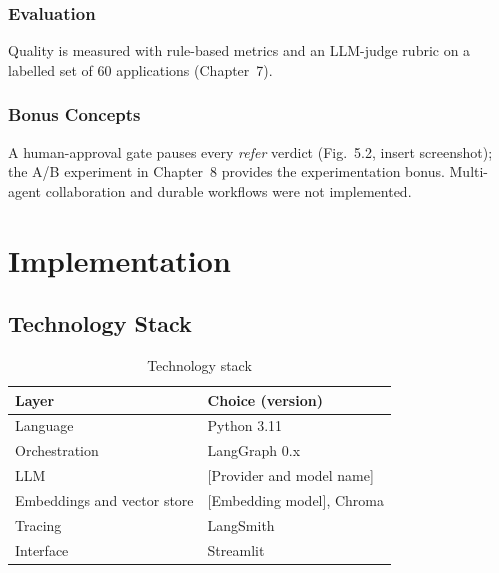 \documentclass[12pt,a4paper,oneside]{report}
\newif\ifguidance
\newcommand{\guide}[1]{%
  \ifguidance
  \begin{tcolorbox}[enhanced,breakable,colback=guidebg,colframe=bmsblue,
    boxrule=0.6pt,arc=2pt,left=6pt,right=6pt,top=4pt,bottom=4pt,
    fonttitle=\bfseries\small,title={What to write here},
    before upper={\small\setstretch{1.1}}]
  #1
  \end{tcolorbox}
  \fi}
\newcommand{\dodont}[2]{%
  \ifguidance
  \begin{tcolorbox}[enhanced,breakable,sidebyside,sidebyside align=top seam,
    colback=dobg,colbacklower=dontbg,colframe=gray!60,boxrule=0.5pt,arc=2pt,
    lefthand ratio=0.5,left=5pt,right=5pt,top=4pt,bottom=4pt,
    fontupper=\small\setstretch{1.05},fontlower=\small\setstretch{1.05}]
  \textbf{\textcolor{ForestGreen}{\checkmark\ Do}}
  \begin{itemize}[leftmargin=12pt,itemsep=1pt,topsep=2pt]#1\end{itemize}
  \tcblower
  \textbf{\textcolor{BrickRed}{$\times$ Don't}}
  \begin{itemize}[leftmargin=12pt,itemsep=1pt,topsep=2pt]#2\end{itemize}
  \end{tcolorbox}
  \fi}
\newcommand{\pagebudget}[1]{%
  \ifguidance\noindent{\small\textcolor{bmsblue}{\textbf{Expected length:} #1 pages}}\par\medskip\fi}
\newenvironment{sample}
  {\par\noindent{\footnotesize\bfseries\textcolor{BrickRed}{[SAMPLE --- replace with your own content]}}\par\color{samplecol}}
  {\par\medskip}
\begin{document}
\subsection{Evaluation}
\begin{sample}
Quality is measured with rule-based metrics and an LLM-judge rubric on a labelled set of 60
applications (Chapter~7).
\end{sample}

\subsection{Bonus Concepts}
\begin{sample}
A human-approval gate pauses every \emph{refer} verdict (Fig.~5.2, insert screenshot); the A/B
experiment in Chapter~8 provides the experimentation bonus. Multi-agent collaboration and durable
workflows were not implemented.
\end{sample}


\chapter{Implementation}
\pagebudget{5--7}
\guide{Describe how the design was built: the technology stack, the data pipeline, the core algorithm,
the prompts, the tools, how loops are bounded, and the repository structure. Another student should be
able to reproduce your system from this chapter and Appendix~\ref{app:run}.}

\section{Technology Stack}
\begin{sample}
\begin{table}[H]
\centering
\caption{Technology stack}
\label{tab:stack}
\small
\begin{tabular}{@{}ll@{}}
\toprule
\textbf{Layer} & \textbf{Choice (version)} \\ \midrule
Language & Python 3.11 \\
Orchestration & LangGraph 0.x \\
LLM & [Provider and model name] \\
Embeddings and vector store & [Embedding model], Chroma \\
Tracing & LangSmith \\
Interface & Streamlit \\
\bottomrule
\end{tabular}
\end{table}
\end{sample}
\dodont{\item Give exact versions and model names.
\item Explain why each major choice was made.}
{\item Do not list libraries you installed but did not use.}
\end{document}
